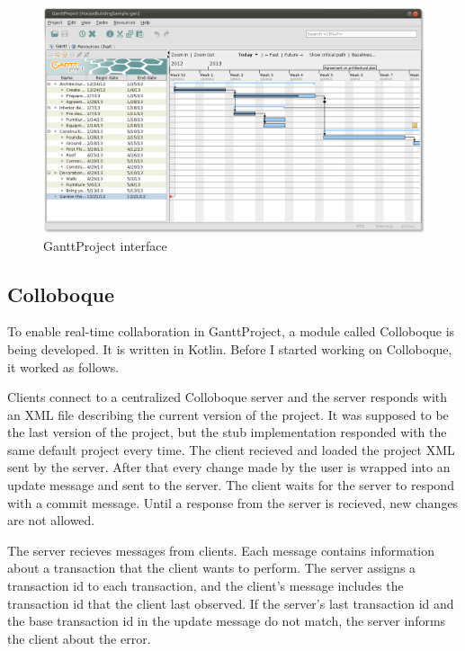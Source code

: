 \documentclass[a4paper, 11pt, oneside]{article}
\theoremstyle{definition}
\begin{document}
\begin{figure}
    \includegraphics[width=\linewidth]{img/ganttproject.png}
    \caption{GanttProject interface}
    \label{fig:ganttscreen}
\end{figure}

\subsection{Colloboque}
To enable real-time collaboration in GanttProject, a module called Colloboque is being developed. It is written in Kotlin. Before I started working on Colloboque, it worked as follows.

Clients connect to a centralized Colloboque server and the server responds with an XML file describing the current version of the project. It was supposed to be the last version of the project, but the stub implementation responded with the same default project every time. The client recieved and loaded the project XML sent by the server. After that every change made by the user is wrapped into an update message and sent to the server. The client waits for the server to respond with a commit message. Until a response from the server is recieved, new changes are not allowed. 


The server recieves messages from clients. Each message contains information about a transaction that the client wants to perform. The server assigns a transaction id to each transaction, and the client's message includes the transaction id that the client last observed. If the server's last transaction id and the base transaction id in the update message do not match, the server informs the client about the error.
\end{document}
